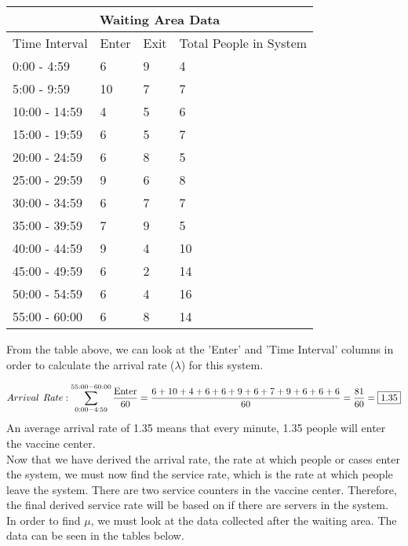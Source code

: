 \documentclass[11pt]{article}
\begin{document}
\setlength{\arrayrulewidth}{1mm}
\setlength{\tabcolsep}{18pt}
\renewcommand{\arraystretch}{0.75}
\begin{center}
\begin{tabular}
{|p{2.2cm}|p{2.2cm}|p{2.2cm}|p{2.2cm}|}
\hline
\multicolumn{4}{|c|}{Waiting Area Data} \\
\hline
Time \hspace{11mm}Interval & Enter & Exit & Total People in System \\
\hline
0:00 - 4:59 & 6 & 9 & 4  \\
5:00 - 9:59 & 10 & 7 & 7  \\
10:00 - 14:59 & 4 & 5 & 6  \\
15:00 - 19:59 & 6 & 5 & 7  \\
20:00 - 24:59 & 6 & 8 & 5  \\
25:00 - 29:59 & 9 & 6 & 8  \\
30:00 - 34:59 & 6 & 7 & 7  \\
35:00 - 39:59 & 7 & 9 & 5  \\
40:00 - 44:59 & 9 & 4 & 10  \\
45:00 - 49:59 & 6 & 2 & 14  \\
50:00 - 54:59 & 6 & 4 & 16  \\
55:00 - 60:00 & 6 & 8 & 14  \\
\hline
\end{tabular}
\end{center}

From the table above, we can look at the 'Enter' and 'Time Interval' columns in order to calculate the arrival rate ($\lambda$) for this system. 

$$Arrival \hspace{1.5mm} Rate:  \sum_{0:00 - 4:59}^{55:00 - 60:00} \frac{\text{Enter}}{60} = \frac{6+10+4+6+6+9+6+7+9+6+6+6}{60}= \frac{81}{60} = \boxed{1.35}$$
\linebreak
An average arrival rate of 1.35 means that every minute, 1.35 people will enter the vaccine center. \\
Now that we have derived the arrival rate, the rate at which people or cases enter the system, we must now find the service rate, which is the rate at which people leave the system. There are two service counters in the vaccine center. Therefore, the final derived service rate will be based on if there are servers in the system. In order to find $\mu$, we must look at the data collected after the waiting area. The data can be seen in the tables below.
\end{document}
